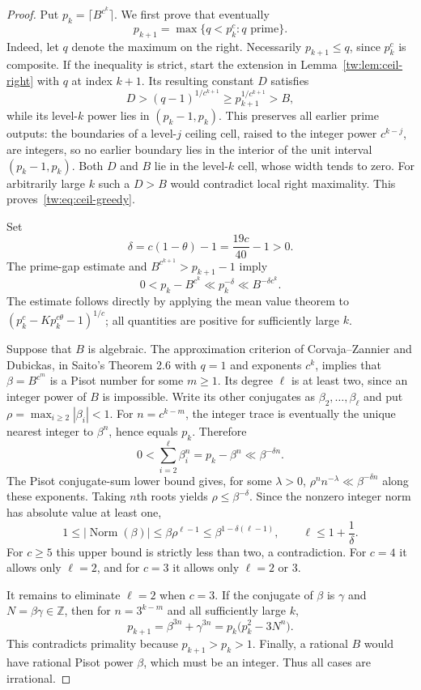 \documentclass[11pt,a4paper]{article}
\theoremstyle{definition}
\theoremstyle{remark}
\numberwithin{equation}{section}
\begin{document}
\begin{proof}
Put $p_k=\lceil B^{c^k}\rceil$. We first prove that eventually
\begin{equation}\label{tw:eq:ceil-greedy}
 p_{k+1}=\max\{q<p_k^c:q\text{ prime}\}.
\end{equation}
Indeed, let $q$ denote the maximum on the right. Necessarily
$p_{k+1}\leq q$, since $p_k^c$ is composite. If the inequality is strict,
start the extension in Lemma~\ref{tw:lem:ceil-right} with $q$ at index
$k+1$. Its resulting constant $D$ satisfies
\[
 D>(q-1)^{1/c^{k+1}}\geq p_{k+1}^{1/c^{k+1}}>B,
\]
while its level-$k$ power lies in $(p_k-1,p_k)$. This preserves all
earlier prime outputs: the boundaries of a level-$j$ ceiling cell,
raised to the integer power $c^{k-j}$, are integers, so no earlier
boundary lies in the interior of the unit interval $(p_k-1,p_k)$.
Both $D$ and $B$ lie in the level-$k$ cell, whose width tends to zero.
For arbitrarily large $k$ such a $D>B$ would contradict local right
maximality. This proves~\eqref{tw:eq:ceil-greedy}.

Set
\[
 \delta=c(1-\theta)-1=\frac{19c}{40}-1>0.
\]
The prime-gap estimate and $B^{c^{k+1}}>p_{k+1}-1$ imply
\begin{equation}\label{tw:eq:ceil-approx}
 0<p_k-B^{c^k}\ll p_k^{-\delta}\ll B^{-\delta c^k}.
\end{equation}
The estimate follows directly by applying the mean value theorem to
$(p_k^c-Kp_k^{c\theta}-1)^{1/c}$; all quantities are positive for
sufficiently large $k$.

Suppose that $B$ is algebraic. The approximation criterion of
Corvaja--Zannier and Dubickas, in Saito's Theorem 2.6 with $q=1$ and
exponents $c^k$, implies that $\beta=B^{c^m}$ is a Pisot number for
some $m\geq1$. Its degree $\ell$ is at least two, since an integer
power of $B$ is impossible. Write its other conjugates as
$\beta_2,\ldots,\beta_\ell$ and put
$\rho=\max_{i\geq2}|\beta_i|<1$. For $n=c^{k-m}$, the integer trace
is eventually the unique nearest integer to $\beta^n$, hence equals
$p_k$. Therefore
\[
 0<\sum_{i=2}^{\ell}\beta_i^n=p_k-\beta^n\ll\beta^{-\delta n}.
\]
The Pisot conjugate-sum lower bound gives, for some $\lambda>0$,
$\rho^n n^{-\lambda}\ll\beta^{-\delta n}$ along these exponents.
Taking $n$th roots yields $\rho\leq\beta^{-\delta}$. Since the
nonzero integer norm has absolute value at least one,
\[
 1\leq|\operatorname{Norm}(\beta)|
 \leq\beta\rho^{\ell-1}
 \leq\beta^{1-\delta(\ell-1)},
 \qquad \ell\leq1+\frac1\delta.
\]
For $c\geq5$ this upper bound is strictly less than two, a
contradiction. For $c=4$ it allows only $\ell=2$, and for $c=3$ it
allows only $\ell=2$ or $3$.

It remains to eliminate $\ell=2$ when $c=3$. If the conjugate of
$\beta$ is $\gamma$ and $N=\beta\gamma\in\mathbb Z$, then for
$n=3^{k-m}$ and all sufficiently large $k$,
\[
 p_{k+1}=\beta^{3n}+\gamma^{3n}
 =p_k\bigl(p_k^2-3N^n\bigr).
\]
This contradicts primality because $p_{k+1}>p_k>1$.
Finally, a rational $B$ would have rational Pisot power $\beta$,
which must be an integer. Thus all cases are irrational.
\end{proof}
\end{document}

